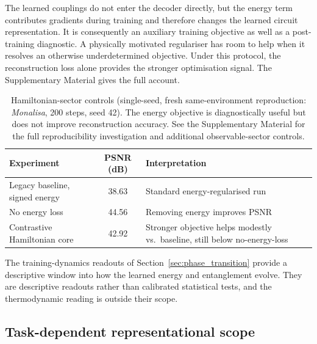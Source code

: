 \documentclass[pdflatex,sn-basic]{sn-jnl}
\begin{document}
The learned couplings do not enter the decoder directly, but the energy term contributes gradients during training and therefore changes the learned circuit representation. It is consequently an auxiliary training objective as well as a post-training diagnostic. A physically motivated regulariser has room to help when it resolves an otherwise underdetermined objective. Under this protocol, the reconstruction loss alone provides the stronger optimisation signal. The Supplementary Material gives the full account.

\begin{table}[t]
  \centering
  \caption{Hamiltonian-sector controls (single-seed, fresh same-environment
           reproduction: \textit{Monalisa}, 200 steps, seed 42). The energy
           objective is diagnostically useful but does not improve reconstruction
           accuracy. See the Supplementary Material for the full reproducibility
           investigation and additional observable-sector controls.}
  \label{tab:hamiltonian_controls}
  \begin{tabularx}{\textwidth}{@{}L{0.30\textwidth} c Y@{}}
    \toprule
    Experiment                      & PSNR (dB) & Interpretation \\
    \midrule
    Legacy baseline, signed energy  & 38.63     & Standard energy-regularised run \\
    No energy loss                  & 44.56     & Removing energy improves PSNR \\
    Contrastive Hamiltonian core    & 42.92     & Stronger objective helps modestly
                                                  vs.\ baseline, still below
                                                  no-energy-loss \\
    \bottomrule
  \end{tabularx}
\end{table}

The training-dynamics readouts of Section~\ref{sec:phase_transition} provide a
descriptive window into how the learned energy and entanglement evolve. They are
descriptive readouts rather than calibrated statistical tests, and the
thermodynamic reading is outside their scope.

\subsection{Task-dependent representational scope}
\label{sec:dequant}
\label{sec:representativeness}
\end{document}
